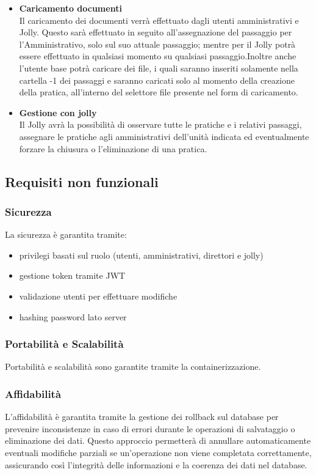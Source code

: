 \documentclass{article}
\begin{document}
\begin{itemize}
\item \textbf{Caricamento documenti}\\
Il caricamento dei documenti verrà effettuato dagli utenti amministrativi e Jolly. Questo sarà effettuato in seguito all'assegnazione del passaggio per l'Amministrativo, solo sul suo attuale passaggio; mentre per il Jolly potrà essere effettuato in qualsiasi momento su qualsiasi passaggio.Inoltre anche l'utente base potrà caricare dei file, i quali saranno inseriti solamente nella cartella -1 dei passaggi e saranno caricati solo al momento della creazione della pratica, all'interno del selettore file presente nel form di caricamento.
\item \textbf{Gestione con jolly}\\
Il Jolly avrà la possibilità di osservare tutte le pratiche e i relativi passaggi, assegnare le pratiche agli amministrativi dell'unità indicata ed eventualmente forzare la chiusura o l'eliminazione di una pratica.
\end{itemize}

\subsection{Requisiti non funzionali}

\subsubsection{Sicurezza}
La sicurezza è garantita tramite:
\begin{itemize}
    \item privilegi basati sul ruolo (utenti, amministrativi, direttori e jolly)
    \item gestione token tramite JWT
    \item validazione utenti per effettuare modifiche
    \item hashing password lato server
\end{itemize}

\subsubsection{Portabilità e Scalabilità}
Portabilità e scalabilità sono garantite tramite la containerizzazione.

\subsubsection{Affidabilità}
L'affidabilità è garantita tramite la gestione dei rollback sul database per prevenire inconsistenze in caso di errori durante le operazioni di salvataggio o eliminazione dei dati. Questo approccio permetterà di annullare automaticamente eventuali modifiche parziali se un'operazione non viene completata correttamente, assicurando così l'integrità delle informazioni e la coerenza dei dati nel database.
\end{document}
